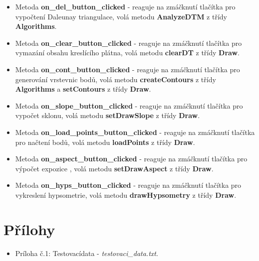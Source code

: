 \documentclass[a4paper, 12pt]{article}
\begin{document}
\begin{itemize}
	\item Metoda \textbf{on\_del\_button\_clicked} - reaguje na zmáčknutí tlačítka pro vypočtení Daleunay triangulace, volá metodu \textbf{AnalyzeDTM} z třídy \textbf{Algorithms}.

	\item Metoda \textbf{on\_clear\_button\_clicked} - reaguje na zmáčknutí tlačítka pro vymazání obsahu kreslícího plátna, volá metodu \textbf{clearDT} z třídy \textbf{Draw}.
	
	\item Metoda \textbf{on\_cont\_button\_clicked} - reaguje na zmáčknutí tlačítka pro generování vrstevnic bodů, volá metodu \textbf{createContours} z třídy \textbf{Algorithms} a \textbf{setContours} z třídy \textbf{Draw}.

	\item Metoda \textbf{on\_slope\_button\_clicked} - reaguje na zmáčknutí tlačítka pro vypočet sklonu, volá metodu \textbf{setDrawSlope} z třídy \textbf{Draw}.

	\item Metoda \textbf{on\_load\_points\_button\_clicked} - reaguje na zmáčknutí tlačítka pro načtení bodů, volá metodu \textbf{loadPoints} z třídy \textbf{Draw}.
	
	\item Metoda \textbf{on\_aspect\_button\_clicked} - reaguje na zmáčknutí tlačítka pro výpočet expozice , volá metodu \textbf{setDrawAspect} z třídy \textbf{Draw}.
	
	\item Metoda \textbf{on\_hyps\_button\_clicked} - reaguje na zmáčknutí tlačítka pro vykreslení hypsometrie, volá metodu \textbf{drawHypsometry} z třídy \textbf{Draw}.

\end{itemize} 


\clearpage

\section{Přílohy}

\begin{itemize}
	\item Príloha č.1: Testovacídata - \textit{testovaci\_data.txt}.
\end{itemize}
\clearpage
\end{document}
